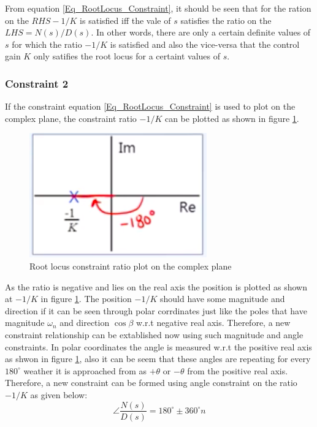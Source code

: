 From equation \eqref{Eq_RootLocus_Constraint}, it should be seen that for the ration on the $RHS - 1 / K$ is satisfied iff the vale of $s$ satisfies the ratio on the $LHS = N(s)/D(s)$. In other words, there are only a certain definite values of $s$ for which the ratio $-1 / K$ is satisfied and also the vice-versa that the control gain $K$ only satifies the root locus for a certaint values of $s$.

\subsubsection{Constraint 2}

If the constraint equation \eqref{Eq_RootLocus_Constraint} is used to plot on the complex plane, the constraint ratio $-1/K$ can be plotted as shown in figure \ref{Fig_RootLocus_ConstPlot}.
\begin{figure}[h!]
	\centering
	\includegraphics[width=0.6\linewidth]{Bilder/RootLocus_ConstraintPlot}
	\caption{Root locus constraint ratio plot on the complex plane}
	\label{Fig_RootLocus_ConstPlot}
\end{figure}
As the ratio is negative and lies on the real axis the position is plotted as shown at $-1 / K$ in figure \ref{Fig_RootLocus_ConstPlot}. The position $-1 / K$ should have some magnitude and direction if it can be seen through polar corrdinates just like the poles that have magnitude $\omega_{n}$ and direction $\cos{\beta}$ w.r.t negative real axis. Therefore, a new constraint relationship can be extablished now using such magnitude and angle constraints. In polar coordinates the angle is measured w.r.t the positive real axis as shwon in figure \ref{Fig_RootLocus_ConstPlot}, also it can be seem that these angles are repeating for every $180^{\circ}$ weather it is approached from as $+ \theta$ or $- \theta$ from the positive real axis. Therefore, a new constraint can be formed using angle constraint on the ratio $-1 / K$ as given below:
\begin{equation}
	\angle \frac{N(s)}{D(s)} = 180^{\circ} \pm 360^{\circ} n
\end{equation}
